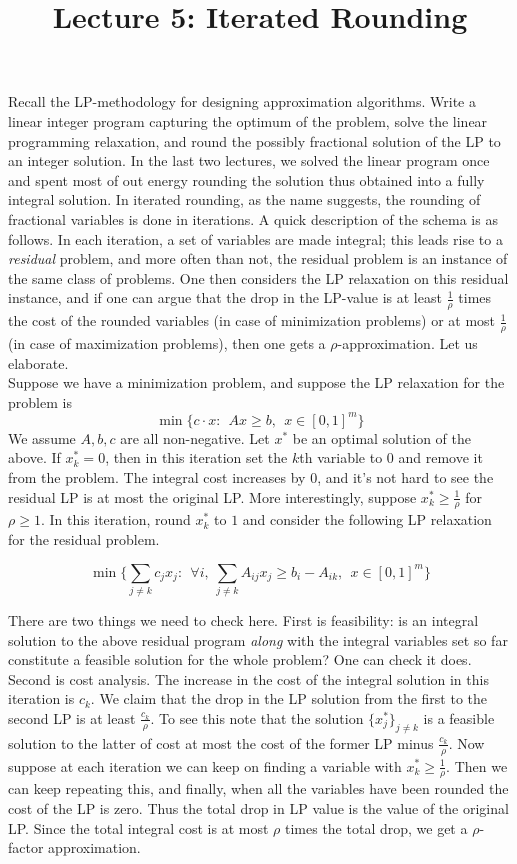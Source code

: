 \documentclass[11pt]{article}
\begin{document}
\title{Lecture 5:  Iterated Rounding}
\author{}
\date{}
\maketitle
\noindent
Recall the LP-methodology for designing approximation algorithms. Write a linear integer program capturing
the optimum of the problem, solve the linear programming relaxation, and round the possibly fractional
solution of the LP to an integer solution. In the last two lectures, we solved the linear program once and 
spent most of out energy rounding the solution thus obtained into a fully integral solution. In iterated rounding,
as the name suggests, the rounding of fractional variables is done in iterations. 
A quick description of the schema is as follows. In each iteration, a set of variables are made integral; this leads rise to a {\em residual} problem, and more often than not, the residual problem is an instance of the same class of problems. One then considers the LP relaxation on this residual instance,
and if one can argue that the drop in the LP-value is at least $\frac{1}{\rho}$ times the cost of the rounded variables (in case of minimization problems) or at most $\frac{1}{\rho}$ (in case of maximization problems), then one gets a $\rho$-approximation. Let us elaborate. \\

\noindent
Suppose we have a minimization problem, and suppose the LP relaxation for the problem is 
$$\min \{c\cdot x: ~~ Ax \ge b, ~~ x\in [0,1]^m\}$$
We assume $A,b,c$ are all non-negative.
Let $x^*$ be an optimal solution of the above. If $x^*_k = 0$, then in this iteration set the $k$th variable to $0$ and remove it from the problem. The integral cost increases by $0$, and it's not hard to see the residual LP is at most the original LP. More interestingly, suppose $x^*_k \ge \frac{1}{\rho}$ for $\rho \ge 1$. In this iteration, round $x^*_k$ to $1$ and consider the following LP relaxation for the residual problem.

$$ \min \{\sum_{j\neq k} c_jx_j: ~~ \forall i, ~\sum_{j\neq k} A_{ij}x_j \ge b_i - A_{ik}, ~~ x\in [0,1]^m\}$$

There are two things we need to check here. First is feasibility: is an integral solution to the above residual program {\em along} with the integral variables set so far constitute a feasible solution for the whole problem?
One can check it does. Second is cost analysis. The increase in the cost of the integral solution in this iteration is $c_k$. We claim that the drop in the LP solution from the first to the second LP is at least $\frac{c_k}{\rho}$.
To see this note that the solution $\{x^*_j\}_{j\neq k}$ is a feasible solution to the latter of cost
at most the cost of the former LP minus $\frac{c_k}{\rho}$.  Now suppose at each iteration we can keep on finding a variable with $x^*_k \ge \frac{1}{\rho}$. Then we can keep repeating this, and finally, when all the variables have been rounded the cost of the LP is zero. Thus the total drop in LP value is the value of the original LP. Since the total integral cost is at most $\rho$ times the total drop, we get a $\rho$-factor approximation. \\
\end{document}
